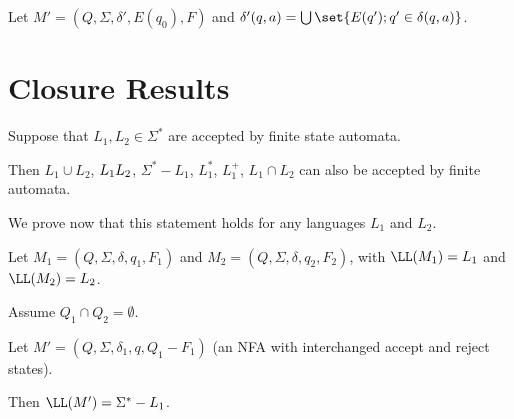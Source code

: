\documentclass[11pt]{scrartcl}
\begin{document}
Let $M' = (Q, \Sigma, \delta', E(q_0), F)$ and
$\delta'(q, a) = \bigcup \set{E(q'); q' \in \delta(q, a)}$.

\section{Closure Results}

Suppose that $L_1, L_2 \in \Sigma^{*}$ are accepted by finite state automata. 

Then $L_1\cup L_2$, $L_1\*L_2$, $\Sigma^{*}-L_1$, $L_1^{*}$, $L_1^{+}$, $L_1\cap L_2$ can also be accepted by finite automata.

We prove now that this statement holds for any languages $L_1$ and $L_2$.

Let $M_1=(Q, \Sigma, \delta, q_1, F_1)$ and $M_2=(Q, \Sigma, \delta, q_2, F_2)$, with $\LL(M_1) = L_1$ and $\LL(M_2) = L_2$.

Assume $Q_1\cap Q_2 = \emptyset$.

Let $M' = (Q,\Sigma, \delta_1, q, Q_1-F_1)$ (an NFA with interchanged accept and reject states). 

Then $\LL(M') = \Sigma^{*} - L_1$.
\end{document}
